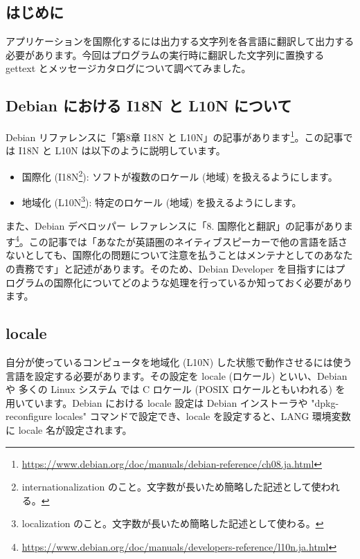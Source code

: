 \documentclass[mingoth,a4paper]{jsarticle}
\begin{document}

\subsection{はじめに}

アプリケーションを国際化するには出力する文字列を各言語に翻訳して出力する必要があります。今回はプログラムの実行時に翻訳した文字列に置換する gettext とメッセージカタログについて調べてみました。

\subsection{Debian における I18N と L10N について}

Debian リファレンスに「第8章 I18N と L10N」の記事があります\footnote{\url{https://www.debian.org/doc/manuals/debian-reference/ch08.ja.html}}。この記事では I18N と L10N は以下のように説明しています。

\begin{itemize}
\item 国際化 (I18N\footnote{internationalization のこと。文字数が長いため簡略した記述として使われる。}): ソフトが複数のロケール (地域) を扱えるようにします。
\item 地域化 (L10N\footnote{localization のこと。文字数が長いため簡略した記述として使わる。}): 特定のロケール (地域) を扱えるようにします。 
\end{itemize}

また、Debian デベロッパー レファレンスに「8. 国際化と翻訳」の記事があります\footnote{\url{https://www.debian.org/doc/manuals/developers-reference/l10n.ja.html}}。この記事では「あなたが英語圏のネイティブスピーカーで他の言語を話さないとしても、国際化の問題について注意を払うことはメンテナとしてのあなたの責務です」と記述があります。そのため、Debian Developer を目指すにはプログラムの国際化についてどのような処理を行っているか知っておく必要があります。


\subsection{locale}

自分が使っているコンピュータを地域化 (L10N) した状態で動作させるには使う言語を設定する必要があります。その設定を locale (ロケール) といい、Debian や 多くの Linux システム では C ロケール (POSIX ロケールともいわれる) を用いています。Debian における locale 設定は Debian インストーラや "dpkg-reconfigure locales" コマンドで設定でき、locale を設定すると、LANG 環境変数に locale 名が設定されます。
\end{document}
